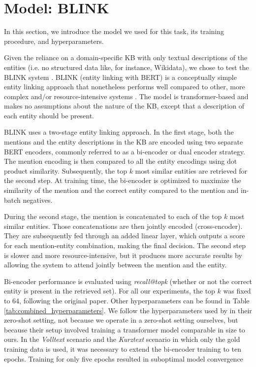 \documentclass[final]{anthology-ch}
\begin{document}
\section{Model: BLINK}\label{sec:models}
In this section, we introduce the model we used for this task, its training procedure, and hyperparameters.

Given the reliance on a domain-specific KB with only textual descriptions of the entities (i.e. no structured data like, for instance, Wikidata), we chose to test the BLINK system \cite{Wu_Petroni_Josifoski_Riedel_Zettlemoyer_2020}. BLINK (entity linking with BERT) is a conceptually simple entity linking approach that nonetheless performs well compared to other, more complex and/or resource-intensive systems \cite{sevgili_neural_2022}. The model is transformer-based and makes no assumptions about the nature of the KB, except that a description of each entity should be present.

BLINK uses a two-stage entity linking approach. In the first stage, both the mentions and the entity descriptions in the KB are encoded using two separate BERT encoders, commonly referred to as a bi-encoder or dual encoder strategy. The mention encoding is then compared to all the entity encodings using dot product similarity. Subsequently, the top $k$ most similar entities are retrieved for the second step. At training time, the bi-encoder is optimized to maximize the similarity of the mention and the correct entity compared to the mention and in-batch negatives.

During the second stage, the mention is concatenated to each of the top $k$ most similar entities. Those concatenations are then jointly encoded (cross-encoder). They are subsequently fed through an added linear layer, which outputs a score for each mention-entity combination, making the final decision. The second step is slower and more resource-intensive, but it produces more accurate results by allowing the system to attend jointly between the mention and the entity.

Bi-encoder performance is evaluated using \textit{recall@topk} (whether or not the correct entity is present in the retrieved set). For all our experiments, the top $k$ was fixed to 64, following the original paper. Other hyperparameters can be found in Table \ref{tab:combined_hyperparameters}. We follow the hyperparameters used by \textcite{Wu_Petroni_Josifoski_Riedel_Zettlemoyer_2020} in their zero-shot setting, not because we operate in a zero-shot setting ourselves, but because their setup involved training a transformer model comparable in size to ours. In the \textit{Volltext} scenario and the \textit{Kurztext} scenario in which only the gold training data is used, it was necessary to extend the bi-encoder training to ten epochs. Training for only five epochs resulted in suboptimal model convergence
\end{document}
